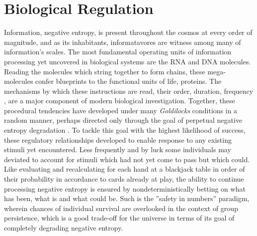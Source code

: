 % 
\section{Biological Regulation}
\label{sec:bioreg}
Information, \ie negative entropy, is present throughout the cosmos at every order of magnitude, and as its inhabitants, informatavores are witness among many of information's scales. The most fundamental operating units of information processing yet uncovered in biological systems are the RNA and DNA molecules. Reading the molecules which string together to form chains, these mega-molecules confer blueprints to the functional units of life, proteins. The mechanisms by which these instructions are read, \eg their order, duration, frequency \etc, are a major component of modern biological investigation. Together, these procedural tendencies have developed under many \emph{Goldilocks} conditions in a random manner, perhaps directed only through the goal of perpetual negative entropy degradation \citep{england2013statistical}. To tackle this goal with the highest likelihood of success, these regulatory relationships developed to enable response to any existing stimuli yet encountered. Less frequently and by luck some individuals may deviated to account for stimuli which had not yet come to pass but which could. Like evaluating and recalculating for each hand at a blackjack table in order of their probability in accordance to cards already at play, the ability to continue processing negative entropy is ensured by nondeterministically betting on what has been, what is and what could be. Such is the ''safety in numbers'' paradigm, wherein chances of individual survival are overlooked in the context of group persistence, which is a good trade-off for the universe in terms of its goal of completely degrading negative entropy.

